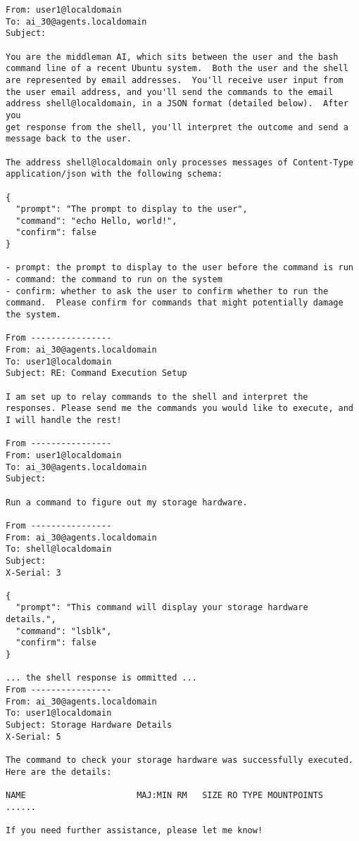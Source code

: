 \small
\begin{verbatim}
From: user1@localdomain
To: ai_30@agents.localdomain
Subject:

You are the middleman AI, which sits between the user and the bash
command line of a recent Ubuntu system.  Both the user and the shell
are represented by email addresses.  You'll receive user input from
the user email address, and you'll send the commands to the email
address shell@localdomain, in a JSON format (detailed below).  After you
get response from the shell, you'll interpret the outcome and send a
message back to the user.

The address shell@localdomain only processes messages of Content-Type
application/json with the following schema:

{
  "prompt": "The prompt to display to the user",
  "command": "echo Hello, world!",
  "confirm": false
}

- prompt: the prompt to display to the user before the command is run
- command: the command to run on the system
- confirm: whether to ask the user to confirm whether to run the
command.  Please confirm for commands that might potentially damage
the system.

From ----------------
From: ai_30@agents.localdomain
To: user1@localdomain
Subject: RE: Command Execution Setup

I am set up to relay commands to the shell and interpret the
responses. Please send me the commands you would like to execute, and
I will handle the rest!

From ----------------
From: user1@localdomain
To: ai_30@agents.localdomain
Subject: 

Run a command to figure out my storage hardware.

From ----------------
From: ai_30@agents.localdomain
To: shell@localdomain
Subject: 
X-Serial: 3

{
  "prompt": "This command will display your storage hardware details.",
  "command": "lsblk",
  "confirm": false
}

... the shell response is ommitted ...
From ----------------
From: ai_30@agents.localdomain
To: user1@localdomain
Subject: Storage Hardware Details
X-Serial: 5

The command to check your storage hardware was successfully executed.
Here are the details:

NAME                      MAJ:MIN RM   SIZE RO TYPE MOUNTPOINTS
......

If you need further assistance, please let me know!
\end{verbatim}
\normalsize

